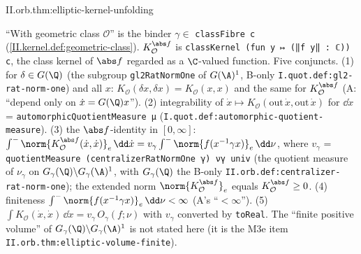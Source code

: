 \begin{tfformal}{II.orb.thm:elliptic-kernel-unfolding}
\begin{tffidelity}
``With geometric class $\mathcal O$'' is the binder $\gamma\in$ \texttt{classFibre c} (\cref{II.kernel.def:geometric-class}). $K^{\abs f}_{\mathcal O}$ is \texttt{classKernel (fun y ↦ (‖f y‖ : ℂ)) c}, the class kernel of $\abs f$ regarded as a $\C$-valued function. Five conjuncts. (1) for $\delta\in G(\Q)$ (the subgroup \texttt{gl2RatNormOne} of $G(\A)^1$, B-only \texttt{I.quot.def:gl2-rat-norm-one}) and all $x$: $K_{\mathcal O}(\delta x,\delta x)=K_{\mathcal O}(x,x)$ and the same for $K^{\abs f}_{\mathcal O}$ (A: ``depend only on $\dot x=G(\Q)x$''). (2) integrability of $\dot x\mapsto K_{\mathcal O}(\mathrm{out}\,\dot x,\mathrm{out}\,\dot x)$ for $\dd\dot x$ = \texttt{automorphicQuotientMeasure μ} (\texttt{I.quot.def:automorphic-quotient-measure}). (3) the $\abs f$-identity in $[0,\infty]$: $\int^-\norm{K^{\abs f}_{\mathcal O}(\dot x,\dot x)}_e\,\dd\dot x=v_\gamma\int^-\norm{f(x^{-1}\gamma x)}_e\,\dd\nu$, where $v_\gamma$ = \texttt{quotientMeasure (centralizerRatNormOne γ) νγ univ} (the quotient measure of $\nu_\gamma$ on $G_\gamma(\Q)\backslash G_\gamma(\A)^1$, with $G_\gamma(\Q)$ the B-only \texttt{II.orb.def:centralizer-rat-norm-one}); the extended norm $\norm{K^{\abs f}_{\mathcal O}}_e$ equals $K^{\abs f}_{\mathcal O}\ge0$. (4) finiteness $\int^-\norm{f(x^{-1}\gamma x)}_e\,\dd\nu<\infty$ (A's ``$<\infty$''). (5) $\int K_{\mathcal O}(\dot x,\dot x)\,\dd\dot x=v_\gamma\,O_\gamma(f;\nu)$ with $v_\gamma$ converted by \texttt{toReal}. The ``finite positive volume'' of $G_\gamma(\Q)\backslash G_\gamma(\A)^1$ is not stated here (it is the M3e item \texttt{II.orb.thm:elliptic-volume-finite}).
\end{tffidelity}
\end{tfformal}
